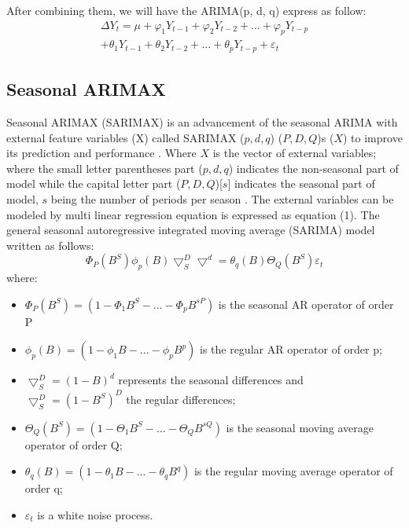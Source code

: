 \documentclass{ieeeojies}
\begin{document}
After combining them, we will have the ARIMA(p, d, q) express as follow:
\begin{equation}
    \begin{aligned}
        \Delta Y_t = \mu + \varphi_1Y_{t-1} + \varphi_2Y_{t-2} + ... +\varphi_pY_{t-p} \\
        + \theta_1Y_{t-1} + \theta_2Y_{t-2} + ... + \theta_pY_{t-p} + \varepsilon_t
    \end{aligned}
\end{equation}

\subsection{Seasonal ARIMAX}
Seasonal ARIMAX (SARIMAX) is an advancement of the seasonal ARIMA with external feature variables (X) called SARIMAX ($p, d, q$) ($P,D,Q$)s ($X$) to improve its prediction and performance \cite{b9}. Where $X$ is the vector of external variables; where the small letter parentheses part ($p,d,q$) indicates the non-seasonal part of model while the capital letter part ($P,D,Q$)[$s$] indicates the seasonal part of model, $s$ being the number of periods per season \cite{b4}. The external variables can be modeled by multi linear regression equation is expressed as equation (1). The general seasonal autoregressive integrated moving average (SARIMA) model written as follows:
\begin{equation}
    \Phi_P(B^S)\phi_p(B)\bigtriangledown_S^D\bigtriangledown^d = \theta_q(B)\Theta_Q(B^S)\varepsilon_t
\end{equation}
where:
\begin{itemize}
    \item $\Phi_P(B^S) = (1 - \Phi_1B^S - ... - \Phi_pB^{sP})$ is the seasonal AR operator of order P
    \item $\phi_p(B) = (1 - \phi_1B - ... - \phi_pB^p)$ is the regular AR operator of order p;
    \item $\bigtriangledown_S^D = (1 - B)^d$ represents the seasonal differences and $\bigtriangledown_S^D = (1 - B^S)^D$ the regular differences;
    \item $\Theta_Q(B^S) = (1 - \Theta_1B^S - ... - \Theta_QB^{sQ})$ is the seasonal moving average operator of order Q;
    \item $\theta_q(B) = (1 - \theta_1B - ... - \theta_qB^q) $ is the regular moving average operator of order q;
    \item $\varepsilon_t$ is a white noise process.
\end{itemize}
\end{document}
